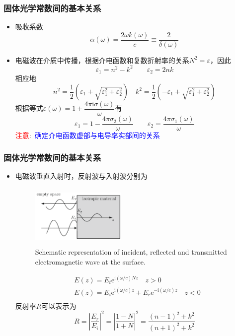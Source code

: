 \documentclass[cjk,slidestop,compress,mathserif,blue]{beamer}
\begin{document}
\frame
{
	\frametitle{固体光学常数间的基本关系}
	\begin{itemize}
		\item 吸收系数
			\begin{displaymath}
				\alpha(\omega)=\frac{2\omega k(\omega)}c\equiv\frac2{\delta(\omega)}
			\end{displaymath}
		\item 电磁波在介质中传播，根据介电函数和复数折射率的关系$N^2=\varepsilon$，因此
			\begin{displaymath}
				\varepsilon_1=n^2-k^2\qquad\varepsilon_2=2nk
			\end{displaymath}
			相应地
			\begin{displaymath}
				n^2=\frac12(\varepsilon_1+\sqrt{\varepsilon_1^2+\varepsilon_2^2})\quad k^2=\frac12(-\varepsilon_1+\sqrt{\varepsilon_1^2+\varepsilon_2^2})
			\end{displaymath}
			根据等式$\varepsilon(\omega)=1+\dfrac{4\pi\mathrm{i}\sigma(\omega)}{\omega}$有
			\begin{displaymath}
				\varepsilon_1=1-\frac{4\pi\sigma_2(\omega)}{\omega}\qquad\varepsilon_2=\frac{4\pi\sigma_1(\omega)}{\omega} 
			\end{displaymath}
			\textcolor{red}{注意}:~\textcolor{blue}{确定介电函数虚部与电导率实部间的关系}
	\end{itemize}
}

\frame
{
	\frametitle{固体光学常数间的基本关系}
	\begin{itemize}
		\item 电磁波垂直入射时，反射波与入射波分别为
\begin{figure}[h!]
\centering
\vspace*{-0.4in}
\includegraphics[height=1.2in,width=1.8in,viewport=0 0 750 600,clip]{Figures/Optic-reflect.png}
\caption{\small \textrm{Schematic representation of incident, reflected and transmitted electromagnetic wave at the surface.}}%
\label{Optic-reflect}
\end{figure} 
			\begin{displaymath}
				\begin{aligned}
					&E(z)=E_t\mathrm{e}^{\mathrm{i}(\omega/c)Nz}\quad z>0\\
					&E(z)=E_i\mathrm{e}^{\mathrm{i}(\omega/c)z}+E_r\mathrm{e}^{-\mathrm{i}(\omega/c)z}\quad z<0\\
				\end{aligned}
			\end{displaymath}
			反射率$R$可以表示为
			\begin{displaymath}
				R=\left|\frac{E_r}{E_i}\right|^2=\left|\frac{1-N}{1+N}\right|^2=\frac{(n-1)^2+k^2}{(n+1)^2+k^2}
			\end{displaymath}
	\end{itemize}
}
\end{document}
